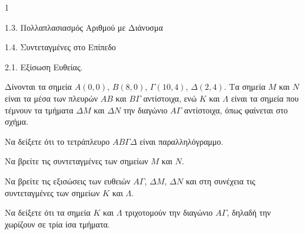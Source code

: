 \begin{ylh}{1}
    \item 1.3. Πολλαπλασιασμός Αριθμού με Διάνυσμα
    \item 1.4. Συντεταγμένες στο Επίπεδο
    \item 2.1. Εξίσωση Ευθείας.
\end{ylh}
\begin{figure}
    \centering
\end{figure}

Δίνονται τα σημεία $A(0,0)$, $B(8,0)$, $\Gamma(10,4)$, $\Delta(2,4)$. Τα σημεία $M$ και $N$ είναι τα μέσα των πλευρών $AB$ και $B\Gamma$ αντίστοιχα, ενώ $K$ και $\Lambda$ είναι τα σημεία που τέμνουν τα τμήματα $\Delta M$ και $\Delta N$ την διαγώνιο $A\Gamma$ αντίστοιχα, όπως φαίνεται στο σχήμα.

\begin{alist}
    \item Να δείξετε ότι το τετράπλευρο $AB\Gamma\Delta$ είναι παραλληλόγραμμο. 
    \item Να βρείτε τις συντεταγμένες των σημείων $M$ και $N$. 
    \item Να βρείτε τις εξισώσεις των ευθειών $A\Gamma$, $\Delta M$, $\Delta N$ και στη συνέχεια τις συντεταγμένες των σημείων $K$ και $\Lambda$. 
    \item Να δείξετε ότι τα σημεία $K$ και $\Lambda$ τριχοτομούν την διαγώνιο $A\Gamma$, δηλαδή την χωρίζουν σε τρία ίσα τμήματα. 
\end{alist}
